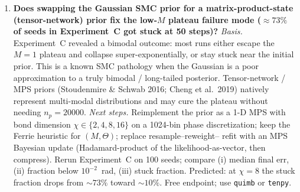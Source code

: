 \begin{enumerate}
\item \textbf{Does swapping the Gaussian SMC prior for a matrix-product-state
    (tensor-network) prior fix the low-$M$ plateau failure mode
    ($\approx 73\%$ of seeds in Experiment~C got stuck at 50 steps)?}
  \emph{Basis.}  Experiment~C revealed a bimodal outcome: most runs either
  escape the $M=1$ plateau and collapse super-exponentially, or stay
  stuck near the initial prior.  This is a known SMC pathology when the
  Gaussian is a poor approximation to a truly bimodal / long-tailed
  posterior.  Tensor-network / MPS priors (Stoudenmire \& Schwab 2016;
  Cheng et al.~2019) natively represent multi-modal distributions and
  may cure the plateau without needing $n_p=20000$.
  \emph{Next steps.}  Reimplement the prior as a 1-D MPS with bond
  dimension $\chi\in\{2,4,8,16\}$ on a 1024-bin phase discretization;
  keep the Ferrie heuristic for $(M,\Theta)$; replace resample--reweight--
  refit with an MPS Bayesian update (Hadamard-product of the
  likelihood-as-vector, then compress).  Rerun Experiment~C on 100
  seeds; compare (i) median final err, (ii) fraction below $10^{-2}$~rad,
  (iii) stuck fraction.  Predicted: at $\chi=8$ the stuck fraction drops
  from $\sim 73\%$ toward $\sim 10\%$.  Free endpoint; use \texttt{quimb}
  or \texttt{tenpy}.

\end{enumerate}
